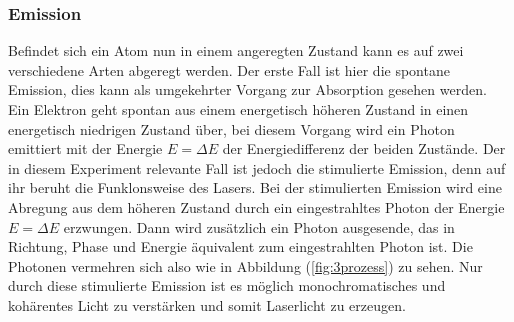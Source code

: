 \subsubsection{Emission}
\label{sec:emissionen}
Befindet sich ein Atom nun in einem angeregten Zustand kann es auf zwei verschiedene Arten abgeregt werden. Der erste Fall ist hier die spontane Emission, dies kann als umgekehrter Vorgang zur Absorption gesehen werden.
Ein Elektron geht spontan aus einem energetisch höheren Zustand in einen energetisch niedrigen Zustand über, bei diesem Vorgang wird ein Photon emittiert mit der Energie $E=\Delta E$ der Energiedifferenz der beiden Zustände.
Der in diesem Experiment relevante Fall ist jedoch die stimulierte Emission, denn auf ihr beruht die Funklonsweise des Lasers. Bei der stimulierten Emission wird eine Abregung aus dem höheren Zustand durch ein eingestrahltes
Photon der Energie $E=\Delta E$ erzwungen. Dann wird zusätzlich ein Photon ausgesende, das in Richtung, Phase und Energie äquivalent zum eingestrahlten Photon ist. Die Photonen vermehren sich also wie in Abbildung (\ref{fig:3prozess}) zu sehen. Nur durch diese stimulierte Emission ist es möglich monochromatisches und kohärentes Licht zu verstärken und somit Laserlicht zu erzeugen.
